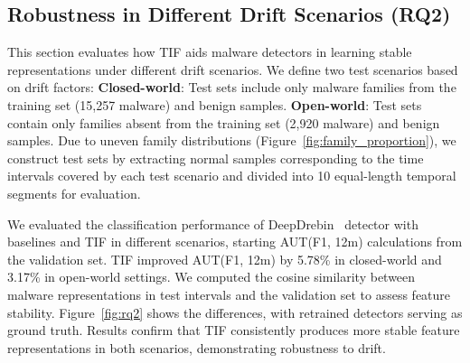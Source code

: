 \begin{center}
\end{center}


\subsection{Robustness in Different Drift Scenarios (RQ2)}
\label{rq2}
This section evaluates how TIF aids malware detectors in learning stable representations under different drift scenarios. We define two test scenarios based on drift factors: \textbf{Closed-world}: Test sets include only malware families from the training set (15,257 malware) and benign samples. \textbf{Open-world}: Test sets contain only families absent from the training set (2,920 malware) and benign samples. Due to uneven family distributions (Figure~\ref{fig:family_proportion}), we construct test sets by extracting normal samples corresponding to the time intervals covered by each test scenario and divided into 10 equal-length temporal segments for evaluation.

We evaluated the classification performance of DeepDrebin~\cite{Grossedeepdrebin} detector with baselines and TIF in different scenarios, starting AUT(F1, 12m) calculations from the validation set. TIF improved AUT(F1, 12m) by 5.78\% in closed-world and 3.17\% in open-world settings. We computed the cosine similarity between malware representations in test intervals and the validation set to assess feature stability. Figure~\ref{fig:rq2} shows the differences, with retrained detectors serving as ground truth. Results confirm that TIF consistently produces more stable feature representations in both scenarios, demonstrating robustness to drift.





